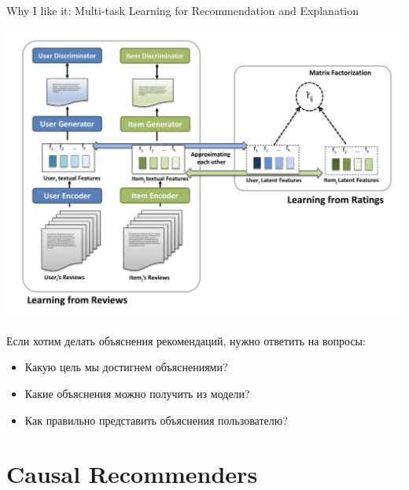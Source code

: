 \documentclass[11pt,aspectratio=169]{beamer}
\begin{document}
\begin{frame}{Why I like it: Multi-task Learning for Recommendation and Explanation \cite{GAN}}

\begin{center}
\includegraphics[scale=0.4]{images/gan.png}
\end{center}

\end{frame}

\begin{frame}

\begin{tcolorbox}[colback=info!5,colframe=info!80,title=]
Если хотим делать объяснения рекомендаций, нужно ответить на вопросы:
\begin{itemize}
\item Какую цель мы достигнем объяснениями?
\item Какие объяснения можно получить из модели?
\item Как правильно представить объяснения пользователю?
\end{itemize}
\end{tcolorbox}

\end{frame}

\section{Causal Recommenders}
\end{document}
